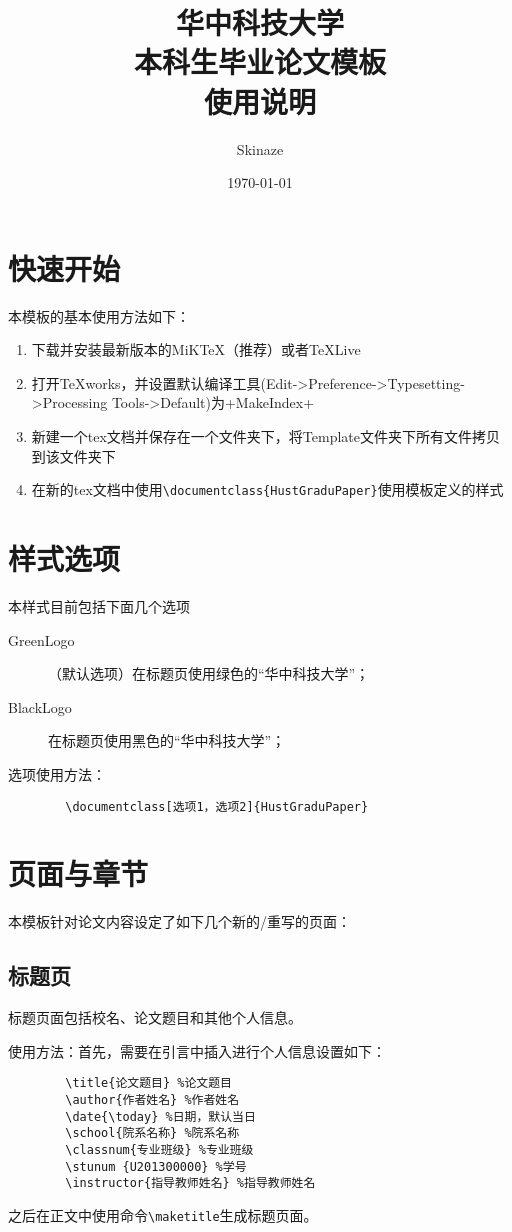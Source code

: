 \documentclass[UTF8,sub3section]{ctexart}
\title{\bfseries \zihao{2} 华中科技大学\\本科生毕业论文模板\\使用说明}
\author{Skinaze}
\date{\today}
\begin{document}
	\maketitle
	\tableofcontents
	\section{快速开始}
	本模板的基本使用方法如下：
	
	\begin{enumerate}[noitemsep]
		\item 下载并安装最新版本的MiK\TeX （推荐）或者\TeX\space Live\\
		\item 打开\TeX works，并设置默认编译工具(Edit->Preference->Typesetting->Processing Tools->Default)为\XeLaTeX+MakeIndex+\BibTeX\\
		\item 新建一个tex文档并保存在一个文件夹下，将Template文件夹下所有文件拷贝到该文件夹下\\
		\item 在新的tex文档中使用\verb|\documentclass{HustGraduPaper}|使用模板定义的样式
	\end{enumerate}
	
	\section{样式选项}
	本样式目前包括下面几个选项
	\begin{description}
		\item[GreenLogo] （默认选项）在标题页使用绿色的“华中科技大学”；
		\item[BlackLogo] 在标题页使用黑色的“华中科技大学”；
	\end{description}
	
	选项使用方法：
	\begin{verbatim}
		\documentclass[选项1，选项2]{HustGraduPaper}
	\end{verbatim}
	
	\section{页面与章节}
	本模板针对论文内容设定了如下几个新的/重写的页面：
	
	\subsection{标题页}
	标题页面包括校名、论文题目和其他个人信息。
	
	使用方法：首先，需要在引言中插入进行个人信息设置如下：
	\begin{verbatim}
		\title{论文题目} %论文题目
		\author{作者姓名} %作者姓名
		\date{\today} %日期，默认当日
		\school{院系名称} %院系名称
		\classnum{专业班级} %专业班级
		\stunum {U201300000} %学号
		\instructor{指导教师姓名} %指导教师姓名
	\end{verbatim}
	之后在正文中使用命令\verb|\maketitle|生成标题页面。
	
\end{document}
